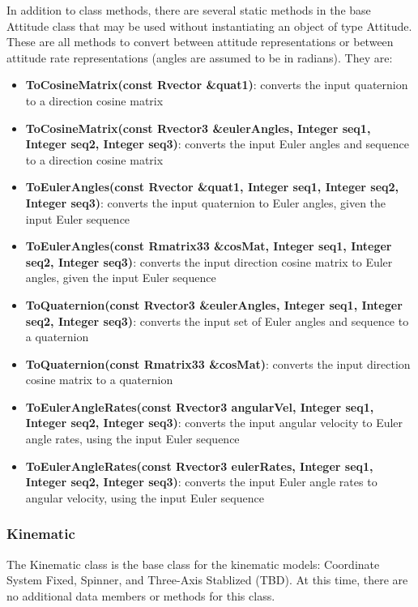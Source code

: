 In addition to class methods, there are several static methods in the base Attitude class that may be used without instantiating an object of type Attitude.  These are all methods to convert between attitude representations or between attitude rate representations (angles are assumed to be in radians).  They are:

\begin{itemize}
\item \textbf{ToCosineMatrix(const Rvector \&quat1)}: converts the input quaternion to a direction cosine matrix
\item \textbf{ToCosineMatrix(const Rvector3 \&eulerAngles, Integer seq1, Integer seq2, Integer seq3)}: converts the input Euler angles and sequence to a direction cosine matrix
\item \textbf{ToEulerAngles(const Rvector \&quat1, Integer seq1, Integer seq2, Integer seq3)}: converts the input quaternion to Euler angles, given the input Euler sequence
\item \textbf{ToEulerAngles(const Rmatrix33 \&cosMat, Integer seq1, Integer seq2, Integer seq3)}: converts the input direction cosine matrix to Euler angles, given the input Euler sequence
\item \textbf{ToQuaternion(const Rvector3 \&eulerAngles, Integer seq1, Integer seq2, Integer seq3)}: converts the input set of Euler angles and sequence to a quaternion
\item \textbf{ToQuaternion(const Rmatrix33 \&cosMat)}: converts the input direction cosine matrix to a quaternion
\item \textbf{ToEulerAngleRates(const Rvector3 angularVel, Integer seq1, Integer seq2, Integer seq3)}: converts the input angular velocity to Euler angle rates, using the input Euler sequence
\item \textbf{ToEulerAngleRates(const Rvector3 eulerRates, Integer seq1, Integer seq2, Integer seq3)}: converts the input Euler angle rates to angular velocity, using the input Euler sequence
\end{itemize}

\subsubsection{Kinematic}

The Kinematic class is the base class for the kinematic models: Coordinate System Fixed, Spinner, and Three-Axis Stablized (TBD).  At this time, there are no additional data members or methods for this class.

